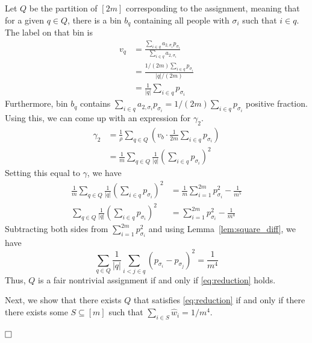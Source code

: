 \documentclass[11pt]{article}
\def\squarebox#1{\hbox to #1{\hfill\vbox to #1{\vfill}}}
\newcommand{\qed}{\hspace*{\fill}\vbox{\hrule\hbox{\vrule\squarebox{.667em}\vrule}\hrule}\smallskip}
\newenvironment{proof}{\noindent{\bf Proof:~~}}{\(\qed\)}
\newcommand{\p}[1]{\left(#1\right)}
\begin{document}
\begin{proof}
  Let $Q$ be the partition of $[2m]$ corresponding to the assignment, meaning
  that for a given $q \in Q$, there is a bin $b_q$ containing all people with
  $\sigma_i$ such that $i \in q$. The label on that bin is
  \begin{align*}
    v_q &= \frac{\sum_{i \in q} a_{2,\sigma_i} p_{\sigma_i}}{\sum_{i \in q}
    a_{2,\sigma_i}} \\
    &= \frac{1/(2m) \sum_{i \in q} p_{\sigma_i}}{|q|/(2m)} \\
    &= \frac{1}{|q|} \sum_{i \in q} p_{\sigma_i}
  \end{align*}
  Furthermore, bin $b_q$ contains $\sum_{i \in q} a_{2,\sigma_i} p_{\sigma_i} =
  1/(2m) \sum_{i \in q} p_{\sigma_i}$ positive fraction. Using this, we can come up
  with an expression for $\gamma_2$.
  \begin{align*}
    \gamma_2 &= \frac{1}{\rho} \sum_{q \in Q} \p{v_b \cdot \frac{1}{2m} \sum_{i
    \in q} p_{\sigma_i}} \\
    &= \frac{1}{m} \sum_{q \in Q} \frac{1}{|q|} \p{\sum_{i \in q}
    p_{\sigma_i}}^2
  \end{align*}
  Setting this equal to $\gamma$, we have
  \begin{align*}
    \frac{1}{m} \sum_{q \in Q} \frac{1}{|q|} \p{\sum_{i \in q} p_{\sigma_i}}^2
    &= \frac{1}{m} \sum_{i=1}^{2m} p_{\sigma_i}^2 - \frac{1}{m^5} \\
    \sum_{q \in Q} \frac{1}{|q|} \p{\sum_{i \in q} p_{\sigma_i}}^2
    &= \sum_{i=1}^{2m} p_{\sigma_i}^2 - \frac{1}{m^4}
  \end{align*}
  Subtracting both sides from $\sum_{i=1}^{2m} p_{\sigma_i}^2$ and using
  Lemma~\ref{lem:square_diff}, we have
  \begin{equation}
    \sum_{q \in Q} \frac{1}{|q|} \sum_{i < j \in q} (p_{\sigma_i} -
    p_{\sigma_j})^2 = \frac{1}{m^4}
    \label{eq:reduction}
  \end{equation}
  Thus, $Q$ is a fair nontrivial assignment if and only if \eqref{eq:reduction}
  holds.

  Next, we show that there exists $Q$ that satisfies \eqref{eq:reduction} if and
  only if there there exists some $S \subseteq [m]$ such that $\sum_{i \in S}
  \hat w_i = 1/m^4$.


\end{proof}
\end{document}
